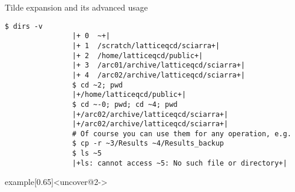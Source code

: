 \begin{frame}[fragile]{Tilde expansion and its advanced usage}
\begin{overlayarea}{\textwidth}{0.63\textheight}
\begin{onlyenv}
\begin{lstlisting}[style=MyBash, aboveskip=3mm]
                $ dirs -v
                |+ 0  ~+|
                |+ 1  /scratch/latticeqcd/sciarra+|
                |+ 2  /home/latticeqcd/public+|
                |+ 3  /arc01/archive/latticeqcd/sciarra+|
                |+ 4  /arc02/archive/latticeqcd/sciarra+|
                $ cd ~2; pwd
                |+/home/latticeqcd/public+|
                $ cd ~-0; pwd; cd ~4; pwd
                |+/arc02/archive/latticeqcd/sciarra+|
                |+/arc02/archive/latticeqcd/sciarra+|
                # Of course you can use them for any operation, e.g.
                $ cp -r ~3/Results ~4/Results_backup
                $ ls ~5
                |+ls: cannot access ~5: No such file or directory+|
            \end{lstlisting}
        \end{onlyenv}
    \end{overlayarea}
    \begin{varblock}{example}[0.65\textwidth]{}<uncover@2->
        \large{}
    \end{varblock}
\end{frame}
